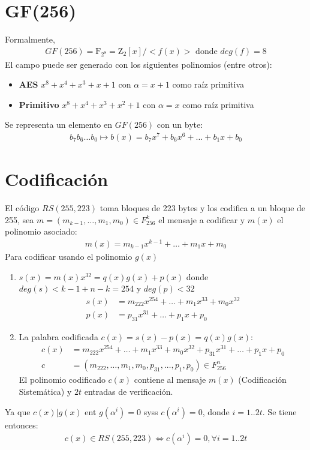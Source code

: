 \documentclass[12pt]{article}
\begin{document}
\section*{GF(256)}

Formalmente,
\begin{align*}
GF(256) = \mathrm{F}_{2^8} = \mathrm{Z}_2[x] / <f(x)> \text{ donde } deg(f) = 8
\end{align*}
El campo puede ser generado con los siguientes polinomios (entre otros):
\begin{itemize}
\item \textbf{AES} $x^8 + x^4 + x^3 + x + 1$ con $\alpha = x + 1$ como raíz primitiva
\item \textbf{Primitivo} $x^8 + x^4 + x^3 + x^2 + 1$ con $\alpha = x$ como raíz primitiva
\end{itemize}
Se representa un elemento en $GF(256)$ con un byte:
\begin{align*}
b_7b_6\ldots b_0 \mapsto b(x) = b_7 x^7 + b_6 x^6 + \ldots + b_1 x + b_0
\end{align*}

\section{Codificación}
El código $RS(255, 223)$ toma bloques de 223 bytes y los codifica a un bloque de 255, 
sea $m = (m_{k-1}, \ldots , m_1, m_0)\in F_{256}^k$ el mensaje a codificar y $m(x)$ el polinomio asociado:
\begin{align*}
m(x) = m_{k-1} x^{k-1} + \ldots + m_1 x + m_0
\end{align*}
Para codificar usando el polinomio $g(x)$
\begin{enumerate}
\item $s(x) = m(x) x^{32} = q(x) g(x) + p(x)$ donde $deg(s) < k - 1 + n - k = 254$ y $deg(p) < 32$
\begin{align*}
s(x) &= m_{222} x^{254} + \ldots + m_1 x^{33} + m_0 x^{32}
\\p(x) &= p_{31} x^{31} + \ldots + p_1 x + p_0
\end{align*}
\item La palabra codificada $c(x) = s(x) - p(x) = q(x)g(x)$:
\begin{align*}
c(x) &= m_{222} x^{254} + \ldots + m_1 x^{33} + m_0 x^{32} + p_{31} x^{31} + \ldots + p_1 x + p_0
\\c &= (m_{222}, \ldots , m_1, m_0, p_{31}, \ldots , p_1, p_0) \in F_{256}^n
\end{align*}
El polinomio codificado $c(x)$ contiene al mensaje $m(x)$ (Codificación Sistemática) y $2t$ entradas de verificación.
\end{enumerate}
Ya que $c(x) | g(x)$ ent $g(\alpha^i) = 0$ syss $c(\alpha^i) = 0$, donde $i = 1..2t$. Se tiene entonces:
\begin{align*}
c(x) \in RS(255, 223) \Leftrightarrow c(\alpha^i) = 0, \forall i = 1..2t
\end{align*}
\end{document}
